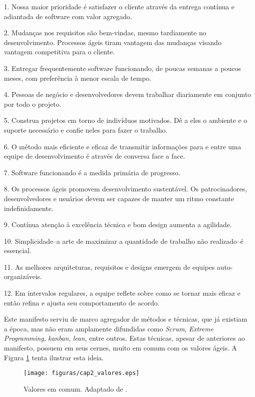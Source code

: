 \begin{citacao}
		1. Nossa maior prioridade é satisfazer o cliente
		através da entrega contínua e adiantada
		de software com valor agregado.

		2. Mudanças nos requisitos são bem-vindas,
		mesmo tardiamente no desenvolvimento.
		Processos ágeis tiram vantagem das
		mudanças visando vantagem competitiva para o cliente.

		3. Entregar frequentemente software funcionando,
		de poucas semanas a poucos meses,
		com preferência à menor escala de tempo.

		4. Pessoas de negócio e desenvolvedores devem trabalhar
		diariamente em conjunto por todo o projeto.

		5. Construa projetos em torno de indivíduos motivados.
		Dê a eles o ambiente e o suporte necessário
		e confie neles para fazer o trabalho.

		6. O método mais eficiente e eficaz de transmitir
		informações para e entre uma equipe de desenvolvimento
		é através de conversa face a face.

		7. Software funcionando é a medida primária de progresso.

		8. Os processos ágeis promovem desenvolvimento
		sustentável. Os patrocinadores, desenvolvedores e
		usuários devem ser capazes de manter um ritmo
		constante indefinidamente.

		9. Contínua atenção à excelência técnica e bom design
		aumenta a agilidade.

		10. Simplicidade--a arte de maximizar a quantidade de
		trabalho não realizado--é essencial.

		11. As melhores arquiteturas, requisitos e designs
		emergem de equipes auto-organizáveis.

		12. Em intervalos regulares, a equipe reflete sobre como
		se tornar mais eficaz e então refina e ajusta seu
		comportamento de acordo. 
\end{citacao}

Este manifesto serviu de marco agregador de métodos e técnicas, que já existiam a época, mas não eram amplamente difundidas como \emph{Scrum}, \emph{Extreme Programming}, \emph{kanban}, \emph{lean}, entre outros. 
Estas técnicas, apesar de anteriores ao manifesto, possuem em seus cernes, muito em comum com os valores ágeis.
A Figura \ref{cap2_valores} tenta ilustrar esta ideia.
\begin{figure}[ht]
	\centering
	\texttt{[image: figuras/cap2\_valores.eps]}
	\caption{Valores em comum. Adaptado de \cite{Greene2014}.}
	\label{cap2_valores}
\end{figure}

